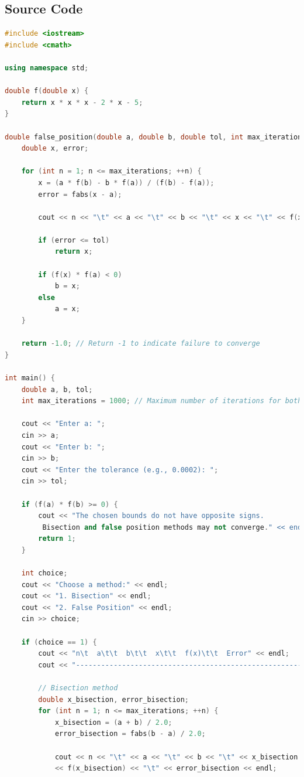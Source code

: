 \documentclass{article}
\begin{document}
\subsection*{Source Code}
\begin{lstlisting}[language=C++]
#include <iostream>
#include <cmath>

using namespace std;

double f(double x) {
    return x * x * x - 2 * x - 5;
}

double false_position(double a, double b, double tol, int max_iterations) {
    double x, error;

    for (int n = 1; n <= max_iterations; ++n) {
        x = (a * f(b) - b * f(a)) / (f(b) - f(a));
        error = fabs(x - a);

        cout << n << "\t" << a << "\t" << b << "\t" << x << "\t" << f(x) << "\t" << error << endl;

        if (error <= tol)
            return x;

        if (f(x) * f(a) < 0)
            b = x;
        else
            a = x;
    }

    return -1.0; // Return -1 to indicate failure to converge
}

int main() {
    double a, b, tol;
    int max_iterations = 1000; // Maximum number of iterations for both methods

    cout << "Enter a: ";
    cin >> a;
    cout << "Enter b: ";
    cin >> b;
    cout << "Enter the tolerance (e.g., 0.0002): ";
    cin >> tol;

    if (f(a) * f(b) >= 0) {
        cout << "The chosen bounds do not have opposite signs.
         Bisection and false position methods may not converge." << endl;
        return 1;
    }

    int choice;
    cout << "Choose a method:" << endl;
    cout << "1. Bisection" << endl;
    cout << "2. False Position" << endl;
    cin >> choice;

    if (choice == 1) {
        cout << "n\t  a\t\t  b\t\t  x\t\t  f(x)\t\t  Error" << endl;
        cout << "--------------------------------------------------------" << endl;

        // Bisection method
        double x_bisection, error_bisection;
        for (int n = 1; n <= max_iterations; ++n) {
            x_bisection = (a + b) / 2.0;
            error_bisection = fabs(b - a) / 2.0;

            cout << n << "\t" << a << "\t" << b << "\t" << x_bisection << "\t" 
            << f(x_bisection) << "\t" << error_bisection << endl;


\end{lstlisting}
\end{document}
